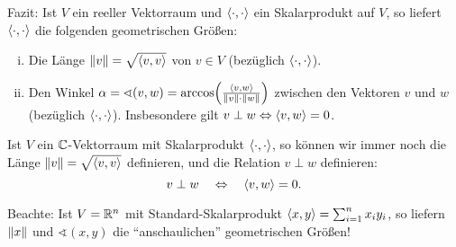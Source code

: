 Fazit: Ist $V$ ein reeller Vektorraum und $\left\langle\cdot,\cdot\right\rangle$ ein Skalarprodukt auf $V$, so liefert $\left\langle\cdot,\cdot\right\rangle$ die folgenden geometrischen Größen:
\begin{enumerate}[(i)]
	\item Die Länge $\left\lVert v\right\rVert = \sqrt{\left\langle v,v\right\rangle}$ von $v \in V$ (bezüglich $\left\langle\cdot,\cdot\right\rangle$).
	\item Den Winkel $\alpha = \sphericalangle(v,w) = \arccos \enb{\frac{\sk{v,w}}{\no{v} \cdot \no{w}}}$ zwischen den Vektoren $v$ und $w$ (bezüglich $\left\langle\cdot,\cdot\right\rangle$).
	Insbesondere gilt $v \perp w \Leftrightarrow \left\langle v,w\right\rangle = 0$.
\end{enumerate}
Ist $V$ ein $\mathbb{C}$-Vektorraum mit Skalarprodukt $\left\langle\cdot,\cdot\right\rangle$, so können wir immer noch die Länge $\left\lVert v\right\rVert = \sqrt{\left\langle v,v\right\rangle}$ definieren, und die Relation $v \perp w$ definieren:
\[
	v \perp w \quad \Leftrightarrow \quad \left\langle v,w\right\rangle = 0.
\]

Beachte: Ist $V = \mathbb{R}^n$ mit Standard-Skalarprodukt $\left\langle x,y\right\rangle = \sum_{i=1}^{n} x_i y_i$, so liefern $\left\lVert x\right\rVert$ und $\sphericalangle(x,y)$ die \enquote{anschaulichen} geometrischen Größen!
\newpage

